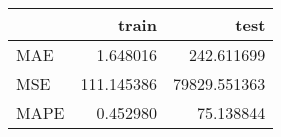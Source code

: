 \begin{tabular}{lrr}
\toprule
{} &       train &          test \\
\midrule
MAE  &    1.648016 &    242.611699 \\
MSE  &  111.145386 &  79829.551363 \\
MAPE &    0.452980 &     75.138844 \\
\bottomrule
\end{tabular}
